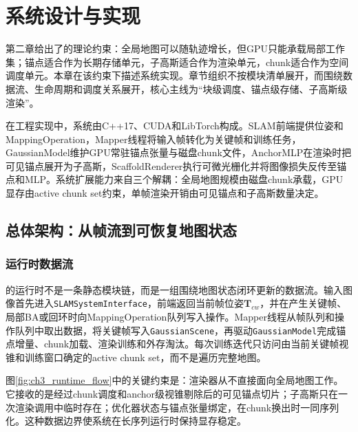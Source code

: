 \chapter{系统设计与实现}

第二章给出了\ScaffoldChunGS 的理论约束：全局地图可以随轨迹增长，但GPU只能承载局部工作集；锚点适合作为长期存储单元，子高斯适合作为渲染单元，chunk适合作为空间调度单元。本章在该约束下描述系统实现。章节组织不按模块清单展开，而围绕数据流、生命周期和调度关系展开，核心主线为``块级调度、锚点级存储、子高斯级渲染''。

在工程实现中，系统由C++17、CUDA和LibTorch构成。SLAM前端提供位姿和MappingOperation，Mapper线程将输入帧转化为关键帧和训练任务，GaussianModel维护GPU常驻锚点张量与磁盘chunk文件，AnchorMLP在渲染时把可见锚点展开为子高斯，ScaffoldRenderer执行可微光栅化并将图像损失反传至锚点和MLP。系统扩展能力来自三个解耦：全局地图规模由磁盘chunk承载，GPU显存由active chunk set约束，单帧渲染开销由可见锚点和子高斯数量决定。

\section{总体架构：从帧流到可恢复地图状态}

\subsection{运行时数据流}

\ScaffoldChunGS 的运行时不是一条静态模块链，而是一组围绕地图状态闭环更新的数据流。输入图像首先进入\texttt{SLAMSystemInterface}，前端返回当前帧位姿$\mathbf{T}_{cw}$，并在产生关键帧、局部BA或回环时向MappingOperation队列写入操作。Mapper线程从帧队列和操作队列中取出数据，将关键帧写入\texttt{GaussianScene}，再驱动\texttt{GaussianModel}完成锚点增量、chunk加载、渲染训练和外存淘汰。每次训练迭代只访问由当前关键帧视锥和训练窗口确定的active chunk set，而不是遍历完整地图。

图\ref{fig:ch3_runtime_flow}中的关键约束是：渲染器从不直接面向全局地图工作。它接收的是经过chunk调度和anchor级视锥剔除后的可见锚点切片；子高斯只在一次渲染调用中临时存在；优化器状态与锚点张量绑定，在chunk换出时一同序列化。这种数据边界使系统在长序列运行时保持显存稳定。

